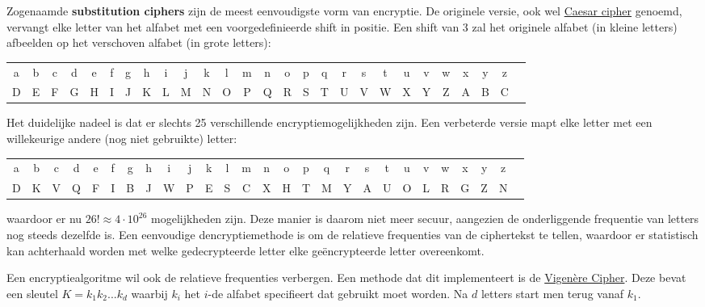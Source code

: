 \documentclass{report}
\begin{document}
	Zogenaamde \textbf{substitution ciphers} zijn de meest eenvoudigste vorm van encryptie. De originele versie, ook wel \underline{Caesar cipher} genoemd, vervangt elke letter van het alfabet met een voorgedefinieerde shift in positie. Een shift van 3 zal het originele alfabet (in kleine letters) afbeelden op het verschoven alfabet (in grote letters):
	\begin{table}[ht]
	\centering
	\setlength\tabcolsep{1pt}
	\begin{tabular}{c c c c c c c c c c c c c c c c c c c c c c c c c c c}
		a&b&c&d&e&f&g&h&i&j&k&l&m&n&o&p&q&r&s&t&u&v&w&x&y&z \\
		D&E&F&G&H&I&J&K&L&M&N&O&P&Q&R&S&T&U&V&W&X&Y&Z&A&B&C
	\end{tabular}
	\end{table}
	Het duidelijke nadeel is dat er slechts 25 verschillende encryptiemogelijkheden zijn. Een verbeterde versie mapt elke letter met een willekeurige andere (nog niet gebruikte) letter:
		\begin{table}[ht]
		\centering
		\setlength\tabcolsep{1pt}
		\begin{tabular}{c c c c c c c c c c c c c c c c c c c c c c c c c c c}
			a&b&c&d&e&f&g&h&i&j&k&l&m&n&o&p&q&r&s&t&u&v&w&x&y&z \\
			D&K&V&Q&F&I&B&J&W&P&E&S&C&X&H&T&M&Y&A&U&O&L&R&G&Z&N
		\end{tabular}
	\end{table}
	waardoor er nu $26! \approx 4\cdot10^{26}$ mogelijkheden zijn. Deze manier is daarom niet meer secuur, aangezien de onderliggende frequentie van letters nog steeds dezelfde is. Een eenvoudige dencryptiemethode is om de relatieve frequenties van de ciphertekst te tellen, waardoor er statistisch kan achterhaald worden met welke gedecrypteerde letter elke geëncrypteerde letter overeenkomt. 

	Een encryptiealgoritme wil ook de relatieve frequenties verbergen. Een methode dat dit implementeert is de \underline{Vigenère Cipher}. Deze bevat een sleutel $K = k_1k_2 ... k_d$ waarbij $k_i$ het $i$-de alfabet specifieert dat gebruikt moet worden. Na $d$ letters start men terug vanaf $k_1$.
\end{document}
